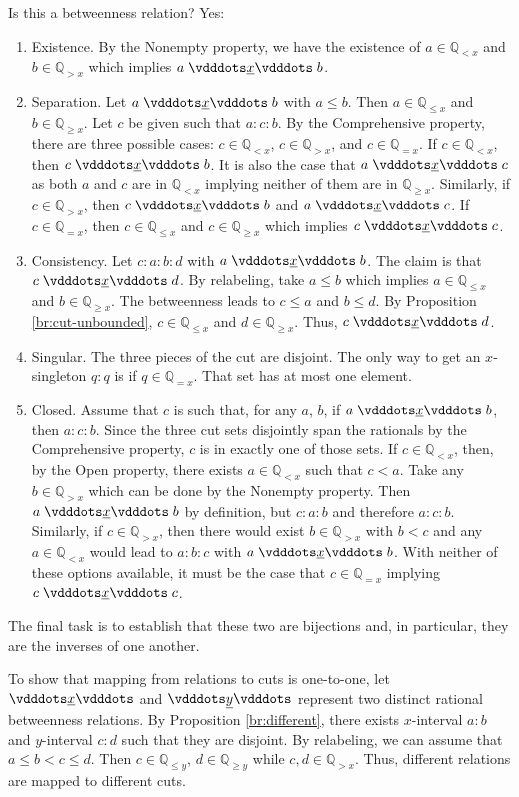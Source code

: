 \documentclass{rmj-public}
\newcommand{\qcut}[2][x]{\ensuremath{\mathbb{Q}_{#2 #1}}}
\newcommand{\qlt}[1][x]{\qcut[#1]{<}}
\newcommand{\qeq}[1][x]{\qcut[#1]{=}}
\newcommand{\qgt}[1][x]{\qcut[#1]{>}}
\newcommand{\qgeq}[1][x]{\qcut[#1]{\geq}}
\newcommand{\qleq}[1][x]{\qcut[#1]{\leq}}
\newcommand{\yrel}{\xrel[y]}
\begin{document}
Is this a betweenness relation? Yes: 
\begin{enumerate}
    \item Existence. By the Nonempty property, we have the existence of $a \in \qlt$ and $b \in \qgt$ which implies $a \xrel b$. 
    \item Separation. Let $a \xrel b$ with $a \leq b$.  Then $a \in \qleq$ and $b \in \qgeq$. Let $c$ be given such that $a:c:b$. By the Comprehensive property, there are three possible cases: $c \in \qlt$, $c \in \qgt$, and $c \in \qeq$. If $c \in \qlt$, then  $c \xrel b$. It is also the case that \sout{$a \xrel c$} as both $a$ and $c$ are in $\qlt$ implying neither of them are in $\qgeq$. Similarly, if $c \in \qgt$, then \sout{$c \xrel b$} and $a \xrel c$. If $c \in \qeq$, then $c \in \qleq$ and $c \in \qgeq$ which implies $c \xrel c$. 
    \item Consistency. Let $c:a:b:d$ with $ a \xrel b$. The claim is that $c \xrel d$. By relabeling, take $a \leq b$ which implies $a \in \qleq$ and $b \in \qgeq$.  The betweenness leads to $c \leq a$ and $ b \leq d$. By Proposition \ref{br:cut-unbounded},  $c \in \qleq$ and $ d \in \qgeq$. Thus, $c \xrel d$.
    \item Singular. The three pieces of the cut are disjoint. The only way to get an $x$-singleton $q:q$ is if $q \in \qeq$. That set has at most one element. 
    \item Closed. Assume that $c$ is such that, for any $a$, $b$, if $a \xrel b$, then $a:c:b$. Since the three cut sets disjointly span the rationals by the Comprehensive property, $c$ is in exactly one of those sets. If $c \in \qlt$, then, by the Open property, there exists $a \in \qlt$ such that $c < a$. Take any $b \in \qgt$ which can be done by the Nonempty property. Then $a \xrel b$ by definition, but $c: a:b$ and therefore \sout{$a:c:b$}. Similarly, if $c \in \qgt$, then there would exist $b \in \qgt$ with $b < c$ and any $a \in \qlt$ would lead to $a:b:c$ with $a \xrel b$. With neither of these options available, it must be the case that $c \in \qeq$ implying $c \xrel c$.    
\end{enumerate}

The final task is to establish that these two are bijections and, in particular, they are the inverses of one another. 

To show that mapping from relations to cuts is one-to-one, let $\xrel$ and $\yrel$ represent two distinct rational betweenness relations. By Proposition \ref{br:different}, there exists $x$-interval $a:b$ and $y$-interval $c:d$ such that they are disjoint. By relabeling, we can assume that $a \leq b < c \leq d$. Then $c \in \qleq[y]$, $d \in \qgeq[y]$ while $c, d \in \qgt[x]$. Thus, different relations are mapped to different cuts. 
\end{document}
